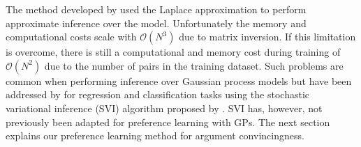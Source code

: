 The method developed by \cite{chu2005preference} used the Laplace approximation to perform approximate
inference over the model. Unfortunately the memory and computational costs scale with $\mathcal{O}(N^3)$
due to matrix inversion. If this limitation is overcome, there is still a computational and memory cost 
during training of $\mathcal{O}(N^2)$ due to the number of pairs in the training dataset.
Such problems are common when performing inference over Gaussian process models but have been addressed
by \cite{hensman2013gaussian,hensman_scalable_2015} for regression and classification tasks using
the stochastic variational inference (SVI) algorithm proposed by \cite{hoffman2013stochastic}. 
SVI has, however, not previously been adapted for preference learning with GPs.
The next section explains our preference learning method for argument convincingness.


